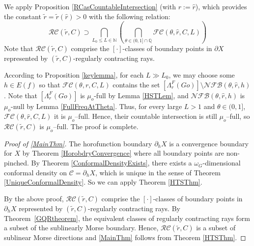 \documentclass{amsart}
\theoremstyle{definition}
\theoremstyle{remark}
\newcommand{\hU}{\partial_h{  X}}
\newcommand{\pU}{\partial{  X}}
\newcommand{\e}[1]{\omega_{#1}}
\begin{document}
We apply Proposition \ref{RCasCountableIntersection} (with $r:=\hat r$), which provides the constant  $\tilde r=\tilde r(\hat r)>0$ with the following relation:
$$
\mathcal{RC}(\tilde r, C)  \supset \bigcap_{L_0\le L\in \mathbb N}\left (\bigcap_{\theta\in (0,1]\cap \mathbb Q} \mathcal{FC}(\theta,\hat r, C,L)\right)$$
Note that  $\mathcal{RC}(\tilde r, C)$ comprise the $[\cdot]$-classes of boundary points in $\pU$ represented by $(\tilde r, C)$-regularly contracting rays. 

According to Proposition \ref{keylemma}, for each $L\gg L_0$, we may choose  some $h\in E(f)$ so that $\mathcal{FC}(\theta,r, C,L)$ contains the  set  $[\Lambda_r^F(Go)]\setminus \mathcal{NFB}(\theta,\hat  r, h)$. Note that $[\Lambda_r^F(Go)]$ is $\mu_o$-full by Lemma \ref{HSTLem}, and    $\mathcal{NFB}(\theta,\hat r, h)$ is $\mu_o$-null by Lemma \ref{FullFreqAtTheta}. Thus,  for every large $L>1$ and $\theta\in (0,1]$, $\mathcal{FC}(\theta,\hat r, C,L)$ it is $\mu_o$--full. Hence,  their countable intersection  is still $\mu_o$--full, so $\mathcal {RC}(\tilde r,C)$ is $\mu_o$--full.  The proof is complete.


\begin{proof}[Proof of \ref{MainThm}]
The horofunction boundary $\hU$ is a convergence boundary for $X$ by Theorem \ref{HorobdryConvergence} where all boundary points are non-pinched. By Theorem \ref{ConformalDensityExists}, there exists a   $\e G$-dimensional conformal density on  $\mathcal C= \hU$, which is unique in the sense of Theorem \ref{UniqueConformalDensity}. So we can apply Theorem \ref{HTSThm}.

By the above proof, $\mathcal{RC}(\tilde r, C)$ comprise the $[\cdot]$-classes of boundary points in $\hU$ represented by $(\tilde r, C)$-regularly contracting rays. By Theorem~\ref{GQRtheorem}, the equivalent classes of regularly contracting rays  form a subset of the sublinearly Morse boundary. Hence, $\mathcal{RC}(\tilde r, C)$  is a subset of sublinear Morse directions and   \ref{MainThm}  follows  from Theorem \ref{HTSThm}. 
\end{proof}

\end{document}

